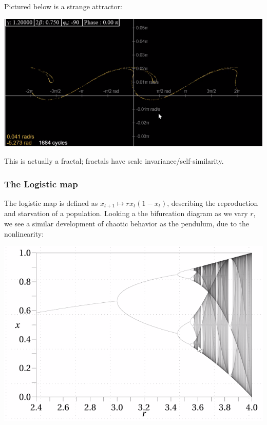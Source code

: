 \documentclass[../PHYS306Notes.tex]{subfiles}
\begin{document}
Pictured below is a strange attractor:
\begin{center}
    \includegraphics[scale=0.7]{Lecture-33/l33-img19.png}
\end{center}
This is actually a fractal; fractals have scale invariance/self-similarity.

\subsubsection{The Logistic map}
The logistic map is defined as $x_{t+1} \mapsto rx_t(1 - x_t)$, describing the reproduction and starvation of a population. Looking a the bifurcation diagram as we vary $r$, we see a similar development of chaotic behavior as the pendulum, due to the nonlinearity:
\begin{center}
    \includegraphics[scale=0.7]{Lecture-33/l33-img20.png}
\end{center}
\end{document}
